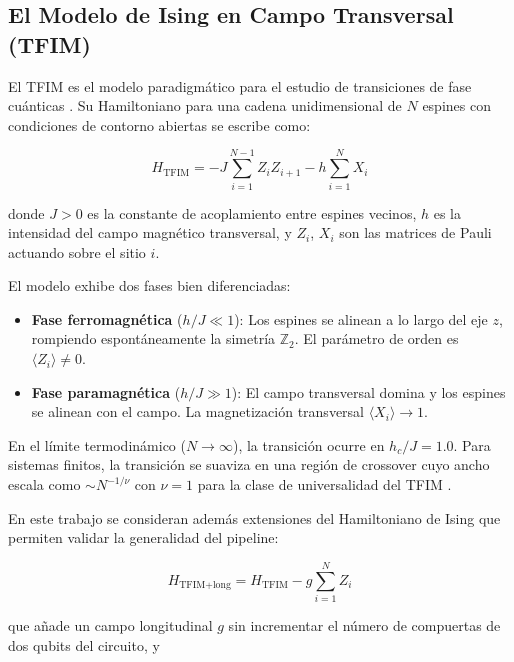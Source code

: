 \documentclass[11pt,a4paper,spanish]{book}
\begin{document}
\subsection{El Modelo de Ising en Campo Transversal (TFIM)}

El TFIM es el modelo paradigmático para el estudio de transiciones de fase cuánticas \citep{dutta2015}. Su Hamiltoniano para una cadena unidimensional de $N$ espines con condiciones de contorno abiertas se escribe como:

\begin{equation}
H_{\text{TFIM}} = -J \sum_{i=1}^{N-1} Z_i Z_{i+1} - h \sum_{i=1}^{N} X_i
\label{eq:tfim}
\end{equation}

\noindent donde $J > 0$ es la constante de acoplamiento entre espines vecinos, $h$ es la intensidad del campo magnético transversal, y $Z_i$, $X_i$ son las matrices de Pauli actuando sobre el sitio $i$.

El modelo exhibe dos fases bien diferenciadas:

\begin{itemize}
    \item \textbf{Fase ferromagnética} ($h/J \ll 1$): Los espines se alinean a lo largo del eje $z$, rompiendo espontáneamente la simetría $\mathbb{Z}_2$. El parámetro de orden es $\langle Z_i \rangle \neq 0$.
    \item \textbf{Fase paramagnética} ($h/J \gg 1$): El campo transversal domina y los espines se alinean con el campo. La magnetización transversal $\langle X_i \rangle \to 1$.
\end{itemize}

En el límite termodinámico ($N \to \infty$), la transición ocurre en $h_c/J = 1.0$. Para sistemas finitos, la transición se suaviza en una región de crossover cuyo ancho escala como $\sim N^{-1/\nu}$ con $\nu = 1$ para la clase de universalidad del TFIM \citep{dutta2015, sachdev2011}.

En este trabajo se consideran además extensiones del Hamiltoniano de Ising que permiten validar la generalidad del pipeline:

\begin{equation}
H_{\text{TFIM+long}} = H_{\text{TFIM}} - g \sum_{i=1}^{N} Z_i
\label{eq:tfim_long}
\end{equation}

\noindent que añade un campo longitudinal $g$ sin incrementar el número de compuertas de dos qubits del circuito, y
\end{document}
